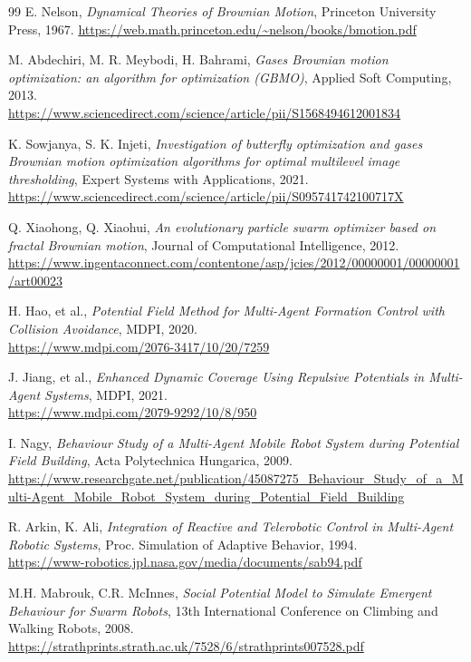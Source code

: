 \documentclass[twoside]{article}
\begin{document}
\begin{thebibliography}{99}
E. Nelson, \textit{Dynamical Theories of Brownian Motion}, Princeton University Press, 1967.
\url{https://web.math.princeton.edu/~nelson/books/bmotion.pdf}

M. Abdechiri, M. R. Meybodi, H. Bahrami, \textit{Gases Brownian motion optimization: an algorithm for optimization (GBMO)}, Applied Soft Computing, 2013.\\
\url{https://www.sciencedirect.com/science/article/pii/S1568494612001834}

K. Sowjanya, S. K. Injeti, \textit{Investigation of butterfly optimization and gases Brownian motion optimization algorithms for optimal multilevel image thresholding}, Expert Systems with Applications, 2021.\\
\url{https://www.sciencedirect.com/science/article/pii/S095741742100717X}

Q. Xiaohong, Q. Xiaohui, \textit{An evolutionary particle swarm optimizer based on fractal Brownian motion}, Journal of Computational Intelligence, 2012.\\
\url{https://www.ingentaconnect.com/contentone/asp/jcies/2012/00000001/00000001/art00023}

H. Hao, et al., \textit{Potential Field Method for Multi-Agent Formation Control with Collision Avoidance}, MDPI, 2020.\\
\url{https://www.mdpi.com/2076-3417/10/20/7259}

J. Jiang, et al., \textit{Enhanced Dynamic Coverage Using Repulsive Potentials in Multi-Agent Systems}, MDPI, 2021.\\
\url{https://www.mdpi.com/2079-9292/10/8/950}

I. Nagy, \textit{Behaviour Study of a Multi-Agent Mobile Robot System during Potential Field Building}, Acta Polytechnica Hungarica, 2009.\\
\url{https://www.researchgate.net/publication/45087275_Behaviour_Study_of_a_Multi-Agent_Mobile_Robot_System_during_Potential_Field_Building}

R. Arkin, K. Ali, \textit{Integration of Reactive and Telerobotic Control in Multi-Agent Robotic Systems}, Proc. Simulation of Adaptive Behavior, 1994.\\
\url{https://www-robotics.jpl.nasa.gov/media/documents/sab94.pdf}

M.H. Mabrouk, C.R. McInnes, \textit{Social Potential Model to Simulate Emergent Behaviour for Swarm Robots}, 13th International Conference on Climbing and Walking Robots, 2008.\\
\url{https://strathprints.strath.ac.uk/7528/6/strathprints007528.pdf}


\end{thebibliography}
\end{document}

